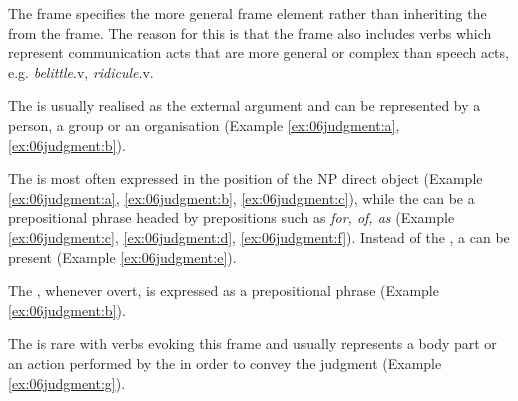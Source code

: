 \documentclass[output=paper,colorlinks,citecolor=brown]{langscibook}
\begin{document}

The frame  specifies the more general frame element  rather than inheriting the  from the  frame. The reason for this is that the frame also includes verbs which represent communication acts that are more general or complex than speech acts, e.g. \textit{belittle}.v, \textit{ridicule}.v. 

The  is usually realised as the external argument and can be represented by a person, a group or an organisation  (Example \ref{ex:06judgment:a}, \ref{ex:06judgment:b}).  

The  is most often expressed in the position of the NP direct object (Example \ref{ex:06judgment:a}, \ref{ex:06judgment:b}, \ref{ex:06judgment:c}), while the  can be a prepositional phrase headed by prepositions such as \textit{for, of, as} (Example \ref{ex:06judgment:c}, \ref{ex:06judgment:d}, \ref{ex:06judgment:f}). Instead of the , a  can be present (Example \ref{ex:06judgment:e}).

The , whenever overt, is expressed as a prepositional phrase (Example \ref{ex:06judgment:b}). 

The  is rare with verbs evoking this frame and usually represents a body part or an action performed by the  in order to convey the judgment (Example \ref{ex:06judgment:g}). 
\end{document}
